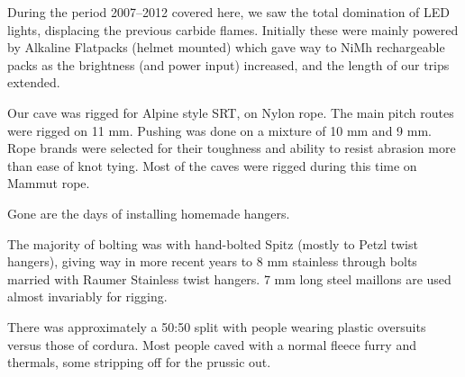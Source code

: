 During the period 2007--2012 covered here, we saw the total domination
of LED lights, displacing the previous carbide flames. Initially these
were mainly powered by Alkaline Flatpacks (helmet mounted) which gave
way to NiMh rechargeable packs as the brightness (and power input)
increased, and the length of our trips extended.

Our cave was rigged for Alpine style SRT, on Nylon rope. The main pitch
routes were rigged on 11 mm. Pushing was done on a mixture of 10 mm and
9 mm. Rope brands were selected for their toughness and ability to
resist abrasion more than ease of knot tying. Most of the caves were
rigged during this time on Mammut rope.

\begin{marginfigure}
\checkoddpage \ifoddpage \forcerectofloat \else \forceversofloat \fi
\centering
 \caption{Gone are the days of installing homemade hangers. }
 \label{homemade hanger}
\end{marginfigure}

The majority of bolting was with hand-bolted Spitz (mostly to Petzl
twist hangers), giving way in more recent years to 8 mm stainless through
bolts married with Raumer Stainless twist hangers. 7 mm long steel
maillons are used almost invariably for rigging.

There was approximately a 50:50 split with people wearing plastic
oversuits versus those of cordura. Most people caved with a normal
fleece furry and thermals, some stripping off for the prussic out.


